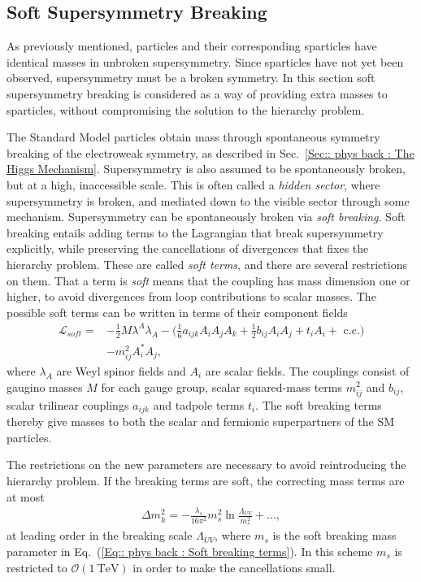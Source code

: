 \documentclass[twoside,english]{uiofysmaster}
\begin{document}
\subsection{Soft Supersymmetry Breaking}\label{Sec:: phys back : Soft Supersymmetry Breaking}

As previously mentioned, particles and their corresponding sparticles have identical masses in unbroken supersymmetry. Since sparticles have not yet been observed, supersymmetry must be a broken symmetry. In this section soft supersymmetry breaking is considered as a way of providing extra masses to sparticles, without compromising the solution to the hierarchy problem.

The Standard Model particles obtain mass through spontaneous symmetry breaking of the electroweak symmetry, as described in Sec.~\ref{Sec:: phys back : The Higgs Mechanism}. Supersymmetry is also assumed to be spontaneously broken, but at a high, inaccessible scale. This is often called a \textit{hidden sector}, where supersymmetry is broken, and mediated down to the visible sector through some mechanism. Supersymmetry can be spontaneously broken via \textit{soft breaking}. Soft breaking entails adding terms to the Lagrangian that break supersymmetry explicitly, while preserving the cancellations of divergences that fixes the hierarchy problem. These are called \textit{soft terms}, and there are several restrictions on them. That a term is \textit{soft} means that the coupling has mass dimension one or higher, to avoid divergences from loop contributions to scalar masses. The possible soft terms can be written in terms of their component fields
\begin{align}\label{Eq:: phys back : Soft breaking terms}
\mathcal{L}_{soft} =& - \frac{1}{2} M \lambda^A \lambda_A - \Big(\frac{1}{6} a_{ijk} A_i A_j A_k + \frac{1}{2} b_{ij} A_i A_j + t_i A_i  + \text{ c.c.} \Big) \nonumber \\& - m_{ij}^2 A_i^*A_j,
\end{align}
where $\lambda_A$ are Weyl spinor fields and $A_i$ are scalar fields. The couplings consist of gaugino masses $M$ for each gauge group, scalar squared-mass terms $m_{ij}^2$ and $b_{ij}$, scalar trilinear couplings $a_{ijk}$ and tadpole terms $t_i$. The soft breaking terms thereby give masses to both the scalar and fermionic superpartners of the SM particles.

The restrictions on the new parameters are necessary to avoid reintroducing the hierarchy problem. If the breaking terms are soft, the correcting mass terms are at most
\begin{align*}
\Delta m_h^2 = - \frac{\lambda_s}{16 \pi^2} m_s^2\ln \frac{\Lambda_{UV}}{m_s^2} +...,
\end{align*}
at leading order in the breaking scale $\Lambda_{UV}$, where $m_s$ is the soft breaking mass parameter in Eq.~(\ref{Eq:: phys back : Soft breaking terms}). In this scheme $m_s$ is restricted to $\mathcal{O}(1~\mathrm{TeV})$ in order to make the cancellations small.
\end{document}
